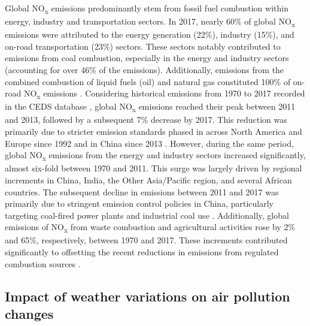 Global NO\textsubscript{x} emissions predominantly stem from fossil fuel combustion within energy, industry and transportation sectors. In 2017, nearly 60\% of global NO\textsubscript{x} emissions were attributed to the energy generation (22\%), industry (15\%), and on-road transportation (23\%) sectors. These sectors notably contributed to emissions from coal combustion, especially in the energy and industry sectors (accounting for over 46\% of the emissions). Additionally, emissions from the combined combustion of liquid fuels (oil) and natural gas constituted 100\% of on-road NO\textsubscript{x} emissions \citep{mcduffie2020global}. Considering historical emissions from 1970 to 2017 recorded in the CEDS database  \citep{mcduffie2020global}, global NO\textsubscript{x} emissions reached their peak between 2011 and 2013, followed by a subsequent 7\% decrease by 2017. This reduction was primarily due to stricter emission standards phased in across North America and Europe since 1992 and in China since 2013 \citep{mcduffie2020global, zheng2018trends}. However, during the same period, global NO\textsubscript{x} emissions from the energy and industry sectors increased significantly, almost six-fold between 1970 and 2011. This surge was largely driven by regional increments in China, India, the Other Asia/Pacific region, and several African countries. The subsequent decline in emissions between 2011 and 2017 was primarily due to stringent emission control policies in China, particularly targeting coal-fired power plants and industrial coal use \citep{zheng2018trends, liu2015reduced}. Additionally, global emissions of NO\textsubscript{x} from waste combustion and agricultural activities rose by 2\% and 65\%, respectively, between 1970 and 2017. These increments contributed significantly to offsetting the recent reductions in emissions from regulated combustion sources \citep{mcduffie2020global}. \par

\subsection{Impact of weather variations on air pollution changes}

